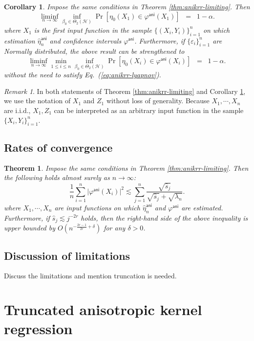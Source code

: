 \documentclass[11pt,a4paper]{article}
\renewcommand{\hat}{\widehat}
\theoremstyle{definition}
\theoremstyle{plain}
\newtheorem{theorem}{Theorem}[section]
\newtheorem{corollary}{Corollary}[section]
\theoremstyle{remark}
\newtheorem{remark}{Remark}[section]
\newcommand{\mH}{\mathcal H}
\newcommand{\ani}{\mathsf{ani}}
\begin{document}
\begin{corollary}
Impose the same conditions in Theorem \ref{thm:anikrr-limiting}. Then 
$$
\liminf_{n\to\infty}\inf_{\beta_0\in\Theta_2(\mH)}\Pr[\eta_0(X_1)\in\varphi^\ani(X_1)] \;\; = \;\; 1-\alpha.
$$
where $X_1$ is the first input function in the sample $\{(X_i,Y_i)\}_{i=1}^n$ on which estimation $\hat\eta_n^{\ani}$ and confidence intervals $\varphi^\ani$.
Furthermore, if $\{\varepsilon_i\}_{i=1}^n$ are Normally distributed, the above result can be strengthened to
$$
\liminf_{n\to\infty}\min_{1\leq i\leq n}\inf_{\beta_0\in\Theta_2(\mH)}\Pr[\eta_0(X_i)\in\varphi^\ani(X_i)] \;\; = \;\; 1-\alpha.
$$
without the need to satisfy Eq.~(\ref{eq:anikrr-lyapnov}).
\label{cor:anikrr-ci}
\end{corollary}

\begin{remark}
In both statements of Theorem \ref{thm:anikrr-limiting} and Corollary \ref{cor:anikrr-ci}, we use the notation of $X_1$ and $Z_1$ without loss of generality.
Because $X_1,\cdots,X_n$ are i.i.d., $X_1,Z_1$ can be interpreted as an arbitrary input function in the sample $\{X_i,Y_i\}_{i=1}^n$.
\end{remark}

\subsection{Rates of convergence}

\begin{theorem}
Impose the same conditions in Theorem \ref{thm:anikrr-limiting}. Then the following holds almost surely as $n\to\infty$:
$$
\frac{1}{n}\sum_{i=1}^n \big|\varphi^\ani(X_i)\big|^2 \lesssim \sum_{j=1}^n \frac{\sqrt{\hat s_j}}{\sqrt{\hat s_j}+\sqrt{\lambda_n}}.
$$
where $X_1,\cdots,X_n$ are input functions on which $\hat\eta_n^\ani$ and $\varphi^\ani$ are estimated.
Furthermore, if $\hat s_j\lesssim j^{-2r}$ holds, then the right-hand side of the above inequality is upper bounded by $O(n^{-\frac{2r-1}{2r}+\delta})$
for any $\delta>0$.
\label{thm:anikrr-rates}
\end{theorem}

\subsection{Discussion of limitations}

{\color{red} Discuss the limitations and mention truncation is needed.}

\section{Truncated anisotropic kernel regression}\label{sec:anitr}
\end{document}
